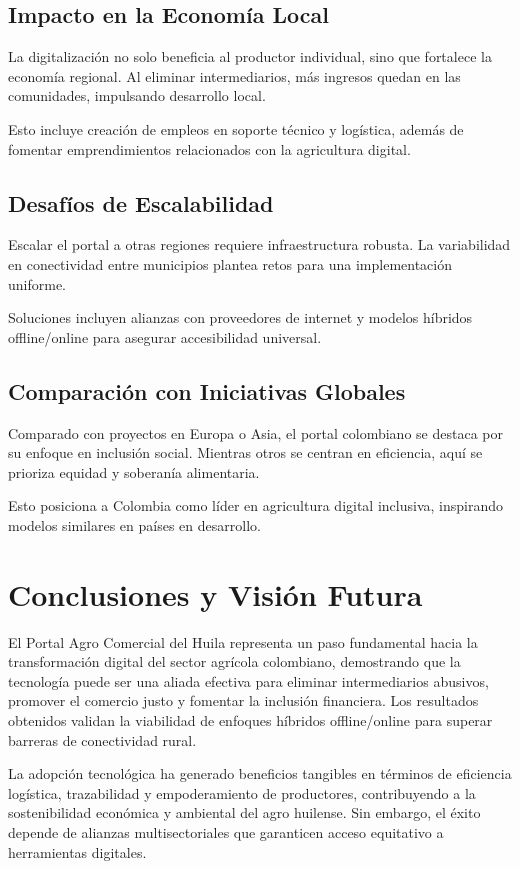 \subsection{Impacto en la Economía Local}
La digitalización no solo beneficia al productor individual, sino que fortalece la economía regional. Al eliminar intermediarios, más ingresos quedan en las comunidades, impulsando desarrollo local.

Esto incluye creación de empleos en soporte técnico y logística, además de fomentar emprendimientos relacionados con la agricultura digital.

\subsection{Desafíos de Escalabilidad}
Escalar el portal a otras regiones requiere infraestructura robusta. La variabilidad en conectividad entre municipios plantea retos para una implementación uniforme.

Soluciones incluyen alianzas con proveedores de internet y modelos híbridos offline/online para asegurar accesibilidad universal.

\subsection{Comparación con Iniciativas Globales}
Comparado con proyectos en Europa o Asia, el portal colombiano se destaca por su enfoque en inclusión social. Mientras otros se centran en eficiencia, aquí se prioriza equidad y soberanía alimentaria.

Esto posiciona a Colombia como líder en agricultura digital inclusiva, inspirando modelos similares en países en desarrollo.

\section{Conclusiones y Visión Futura}

El Portal Agro Comercial del Huila representa un paso fundamental hacia la transformación digital del sector agrícola colombiano, demostrando que la tecnología puede ser una aliada efectiva para eliminar intermediarios abusivos, promover el comercio justo y fomentar la inclusión financiera. Los resultados obtenidos validan la viabilidad de enfoques híbridos offline/online para superar barreras de conectividad rural.

La adopción tecnológica ha generado beneficios tangibles en términos de eficiencia logística, trazabilidad y empoderamiento de productores, contribuyendo a la sostenibilidad económica y ambiental del agro huilense. Sin embargo, el éxito depende de alianzas multisectoriales que garanticen acceso equitativo a herramientas digitales.

